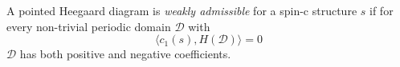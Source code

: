 

    A pointed Heegaard diagram is \emph{weakly admissible} for a spin-c structure $s$ if for every non-trivial periodic domain $\mathcal D$ with 
    \[\langle c_1(s), H(\mathcal D)\rangle = 0\]
    $\mathcal D$ has both positive and negative coefficients.
